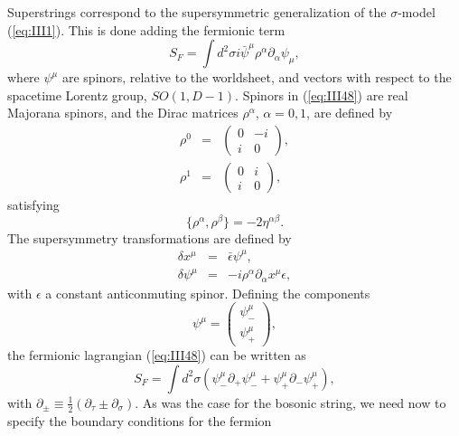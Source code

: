 Superstrings correspond to the supersymmetric generalization of
the $\sigma$-model (\ref{eq:III1}). This is done adding the
fermionic term
\begin{equation}
S_F = \int d^2 \sigma i \bar{\psi}^{\mu} \rho^{\alpha}
\partial_{\alpha} \psi_{\mu},
\label{eq:III48}
\end{equation}
where $\psi^{\mu}$ are spinors, relative to the worldsheet, and
vectors with respect to the spacetime Lorentz group, $SO(1,D-1)$.
Spinors in (\ref{eq:III48}) are real Majorana spinors, and the
Dirac matrices $\rho^{\alpha}$, $\alpha=0,1$, are defined by
\begin{eqnarray}
\rho^0 & = & \left( \begin{array}{cc} 0 & -i \\
				      i & 0 \end{array} \right),
\nonumber \\
\rho^1 & = & \left( \begin{array}{cc} 0 & i \\
				      i & 0 \end{array} \right),
\label{eq:III49}
\end{eqnarray}
satisfying
\begin{equation}
\{\rho^{\alpha}, \rho^{\beta}\}=-2\eta^{\alpha \beta}.
\label{eq:III50}
\end{equation}
The supersymmetry transformations are defined by
\begin{eqnarray}
\delta x^{\mu} & = & \bar{\epsilon} \psi^{\mu}, \nonumber \\
\delta \psi^{\mu} & = & -i \rho^{\alpha} \partial_{\alpha}
x^{\mu} \epsilon,
\label{eq:III51}
\end{eqnarray}
with $\epsilon$ a constant anticonmuting spinor. Defining the
components
\begin{equation}
\psi^{\mu} = \left( \begin{array}{c} \psi_-^{\mu} \nonumber \\
\psi_+^{\mu} \end{array} \right),
\label{eq:III52}
\end{equation}
the fermionic lagrangian (\ref{eq:III48}) can be written as
\begin{equation}
S_F = \int d^2 \sigma ( \psi_-^{\mu} \partial_+ \psi_-^{\mu} +
\psi_+^{\mu} \partial_- \psi_+^{\mu}),
\label{eq:III53}
\end{equation}
with $\partial_{\pm} \equiv \frac {1}{2} (\partial_{\tau} \pm
\partial_{\sigma})$. As was the case for the bosonic string, we
need now to specify the boundary conditions for the fermion
